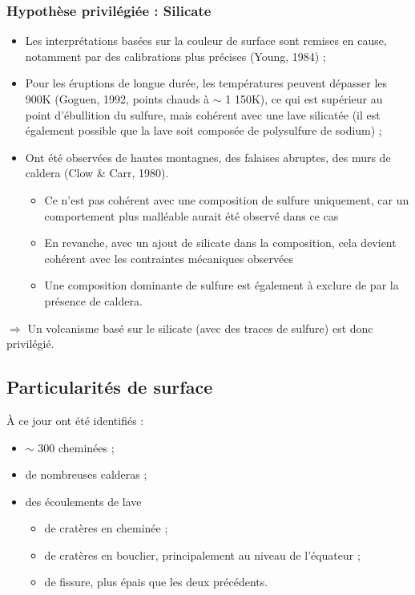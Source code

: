 \documentclass[10pt,a4paper, twocolumns]{article}
\begin{document}
	\subsubsection{Hypothèse privilégiée : Silicate}
	
	\begin{itemize}
		\item Les interprétations basées sur la couleur de surface sont remises en cause, notamment par des calibrations plus précises (Young, 1984) ;
		\item Pour les éruptions de longue durée, les températures peuvent dépasser les 900K (Goguen, 1992, points chauds à $\sim$  1 150K), ce qui est supérieur au point d'ébullition du sulfure, mais cohérent avec une lave silicatée (il est également possible que la lave soit composée de polysulfure de sodium) ;
		\item Ont été observées de hautes montagnes, des falaises abruptes, des murs de caldera (Clow \& Carr, 1980).
		\begin{itemize}
			\item Ce n'est pas cohérent avec une composition de sulfure uniquement, car un comportement plus malléable aurait été observé dans ce cas
			\item En revanche, avec un ajout de silicate dans la composition, cela devient cohérent avec les contraintes mécaniques observées
			\item Une composition dominante de sulfure est également à exclure de par la présence de caldera.
		\end{itemize}
	\end{itemize}
	
	$\Rightarrow$ Un volcanisme basé sur le silicate (avec des traces de sulfure) est donc privilégié.

\subsection{Particularités de surface}
	À ce jour ont été identifiés :
	\begin{itemize}
		\item $\sim$ 300 cheminées ;
		\item de nombreuses calderas ;
		\item des écoulements de lave
		\begin{itemize}
			\item de cratères en cheminée ;
			\item de cratères en bouclier, principalement au niveau de l'équateur ;
			\item de fissure, plus épais que les deux précédents.
		\end{itemize}
	\end{itemize}
	
\end{document}
